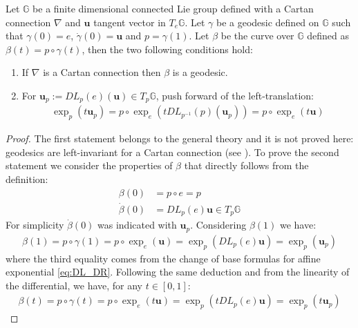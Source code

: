 \begin{prop}
	Let $\mathbb{G}$ be a finite dimensional connected Lie group defined with a Cartan connection $\nabla$ and $\mathbf{u}$ tangent vector in $ T_{e}\mathbb{G}$. Let $\gamma$ be a geodesic defined on $\mathbb{G}$ such that $\gamma(0) = e$, $\dot{\gamma}(0) =\mathbf{u}$ and $p = \gamma(1)$. Let $\beta$ be the curve over $\mathbb{G}$ defined as $\beta(t) = p\circ \gamma(t)$, then the two following conditions hold:
	\begin{enumerate}
		\item If $\nabla$ is a Cartan connection then $\beta$ is a geodesic.
		\item For $\mathbf{u}_{p} := DL_{p}(e)(\mathbf{u}) \in T_{p}\mathbb{G}$, push forward of the left-translation:
		\begin{align}\label{eq:lemma_pt}
		\exp_{p}(t\mathbf{u}_{p}) = p\circ \exp_{e}( t DL_{p^{-1}}(p)(\mathbf{u}_{p}) ) 
		= p\circ \exp_{e}(t\mathbf{u})
		\end{align}
	\end{enumerate}
\end{prop}
\begin{proof}
	The first statement belongs to the general theory and it is not proved here: geodesics are left-invariant for a Cartan connection (see \cite{do1992riemannian}). To prove the second statement we consider the properties of $\beta$ that directly follows from the definition:
	\begin{align*}
		\beta(0) &= p\circ e = p \\
		\dot{\beta}(0) &= DL_{p}(e)\mathbf{u}\in T_{p}\mathbb{G}
	\end{align*}
	For simplicity $\dot{\beta}(0) $ was indicated with $\mathbf{u}_{p}$. Considering $\beta(1)$ we have: 
	\begin{align*}
		   \beta(1) = p\circ \gamma(1) 
						= p\circ \exp_{e}(\mathbf{u}) 
						= \exp_{p}( DL_p(e) \mathbf{u} ) 
						= \exp_{p}( \mathbf{u}_{p} ) 
	\end{align*}
	where the third equality comes from the change of base formulas for affine exponential \ref{eq:DL_DR}. Following the same deduction and from the linearity of the differential, we have, for any $t\in [ 0,1 ]$:
	\begin{align*}
	\beta(t) = p\circ \gamma(t) 
	= p\circ \exp_{e}(t\mathbf{u}) 
	= \exp_{p}( tDL_p(e) \mathbf{u} ) 
	= \exp_{p}( t\mathbf{u}_{p} ) 
	\end{align*}
\end{proof}

